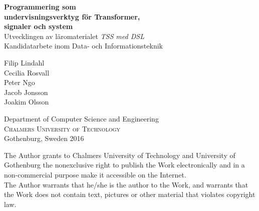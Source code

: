 
\begin{titlepage}

\addtolength{\voffset}{2cm}


\mbox{}
\vfill
\renewcommand{\familydefault}{\sfdefault} \normalfont %
\textbf{{\Huge Programmering som\\ undervisningsverktyg för Transformer,\\signaler och system\\[0.2cm]}}
{\Large Utvecklingen av läromaterialet \textit{TSS med DSL} }\\[0.5cm]
Kandidatarbete inom Data- och Informationsteknik \setlength{\parskip}{1cm}

\begin{flushleft}
  \Large
  Filip Lindahl\\
  Cecilia Rosvall\\
  Peter Ngo\\
  Jacob Jonsson\\
  Joakim Olsson\\
\end{flushleft}


\setlength{\parskip}{2.9cm}

Department of Computer Science and Engineering \\
\textsc{Chalmers University of Technology} \\
Gothenburg, Sweden 2016

\renewcommand{\familydefault}{\rmdefault} \normalfont %
\end{titlepage}

\newpage
\thispagestyle{plain}

The Author grants to Chalmers University of Technology and University
of Gothenburg the nonexclusive right to publish the Work
electronically and in a non-commercial purpose make it accessible on
the Internet. \\
The Author warrants that he/she is the author to the
Work, and warrants that the Work does not contain text, pictures or
other material that violates copyright law.


